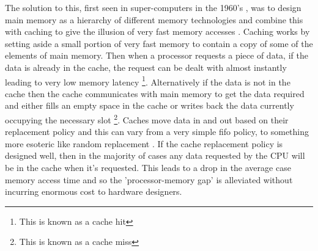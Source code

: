 The solution to this, first seen in super-computers in the 1960's \cite{pattersonComputerOrganizationDesign2018}, was to design main memory as a hierarchy of different memory technologies \cite{wilkesSlaveMemoriesDynamic1965} and combine this with caching to give the illusion of very fast memory accesses \cite{smithCacheMemories1982}. Caching works by setting aside a small portion of very fast memory to contain a copy of some of the elements of main memory. Then when a processor requests a piece of data, if the data is already in the cache, the request can be dealt with almost instantly leading to very low memory latency \footnote{This is known as a cache hit}. Alternatively if the data is not in the cache then the cache communicates with main memory to get the data required and either fills an empty space in the cache or writes back the data currently occupying the necessary slot \footnote{This is known as a cache miss}. Caches move data in and out based on their replacement policy and this can vary from a very simple \gls{fifo} policy, to something more esoteric like random replacement \cite{al-zoubiPerformanceEvaluationCache2004}. If the cache replacement policy is designed well,  then in the majority of cases any data requested by the CPU will be in the cache when it's requested. This leads to a drop in the average case memory access time and so the 'processor-memory gap' is alleviated without incurring enormous cost to hardware designers.


